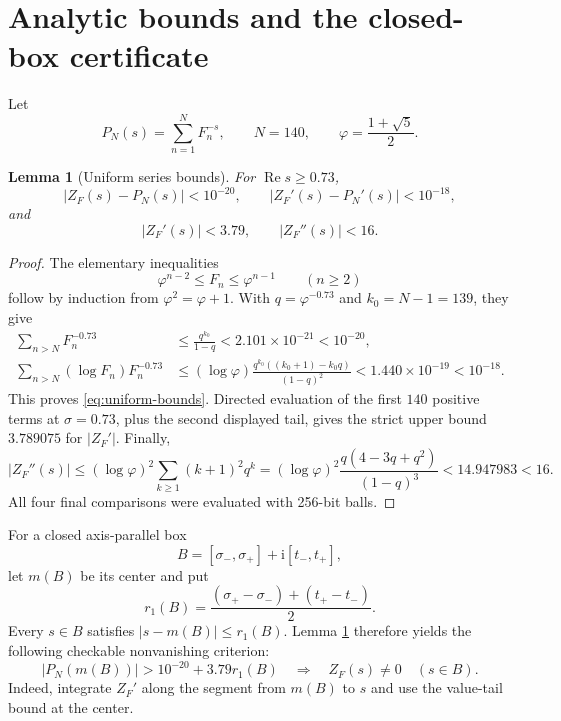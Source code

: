 \documentclass[11pt]{article}
\newtheorem{lemma}[theorem]{Lemma}
\theoremstyle{remark}
\newcommand{\ii}{\mathrm{i}}
\newcommand{\ZF}{Z_F}
\newcommand{\real}{\operatorname{Re}}
\begin{document}
\section{Analytic bounds and the closed-box certificate}

Let
\[
 P_N(s)=\sum_{n=1}^N F_n^{-s},\qquad N=140,
 \qquad \varphi=\frac{1+\sqrt5}{2}.
\]

\begin{lemma}[Uniform series bounds]\label{lem:analytic-bounds}
For $\real s\geq0.73$,
\begin{equation}\label{eq:uniform-bounds}
 |\ZF(s)-P_N(s)|<10^{-20},\qquad
 |\ZF'(s)-P_N'(s)|<10^{-18},
\end{equation}
and
\begin{equation}\label{eq:derivative-bounds}
 |\ZF'(s)|<3.79,\qquad |\ZF''(s)|<16.
\end{equation}
\end{lemma}

\begin{proof}
The elementary inequalities
\[
 \varphi^{n-2}\leq F_n\leq\varphi^{n-1}\qquad(n\geq2)
\]
follow by induction from $\varphi^2=\varphi+1$.  With
$q=\varphi^{-0.73}$ and $k_0=N-1=139$, they give
\begin{align*}
 \sum_{n>N}F_n^{-0.73}
 &\leq\frac{q^{k_0}}{1-q}
   <2.101\times10^{-21}<10^{-20},\\
 \sum_{n>N}(\log F_n)F_n^{-0.73}
 &\leq(\log\varphi)\frac{q^{k_0}
       ((k_0+1)-k_0q)}{(1-q)^2}
   <1.440\times10^{-19}<10^{-18}.
\end{align*}
This proves \eqref{eq:uniform-bounds}.  Directed evaluation of the first
$140$ positive terms at $\sigma=0.73$, plus the second displayed tail,
gives the strict upper bound $3.789075$ for $|\ZF'|$.  Finally,
\[
 |\ZF''(s)|
 \leq(\log\varphi)^2\sum_{k\geq1}(k+1)^2q^k
 = (\log\varphi)^2\frac{q(4-3q+q^2)}{(1-q)^3}
 <14.947983<16.
\]
All four final comparisons were evaluated with 256-bit balls.
\end{proof}

For a closed axis-parallel box
\[
 B=[\sigma_-,\sigma_+] + \ii[t_-,t_+],
\]
let $m(B)$ be its center and put
\[
 r_1(B)=\frac{(\sigma_+-\sigma_-)+(t_+-t_-)}2.
\]
Every $s\in B$ satisfies $|s-m(B)|\leq r_1(B)$.  Lemma
\ref{lem:analytic-bounds} therefore yields the following checkable
nonvanishing criterion:
\begin{equation}\label{eq:box-test}
 |P_N(m(B))|>10^{-20}+3.79r_1(B)
 \quad\Longrightarrow\quad
 \ZF(s)\neq0\quad(s\in B).
\end{equation}
Indeed, integrate $\ZF'$ along the segment from $m(B)$ to $s$ and use the
value-tail bound at the center.
\end{document}
